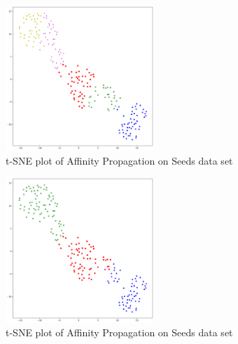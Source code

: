 \begin{figure}[H]
	\begin{center}
		\includegraphics[width=0.5\textwidth]{images/af_seed78.png}
	\end{center}
	\caption{t-SNE plot of Affinity Propagation on Seeds data set}
	\label{fig:af_seeds78}
\end{figure}

\begin{figure}[H]
	\begin{center}
		\includegraphics[width=0.5\textwidth]{images/af_seeds247.png}
	\end{center}
	\caption{t-SNE plot of Affinity Propagation on Seeds data set}
	\label{fig:af_seeds2}
\end{figure}

